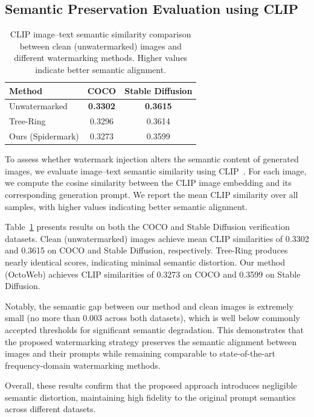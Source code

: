 \documentclass[lettersize,journal,review]{IEEEtran}
\begin{document}
\subsection{Semantic Preservation Evaluation using CLIP}

\begin{table}[t]
\centering
\caption{CLIP image--text semantic similarity comparison between clean (unwatermarked) images and different watermarking methods. Higher values indicate better semantic alignment.}
\label{tab:clip_similarity}
\begin{tabular}{lcc}
\toprule
\textbf{Method} & \textbf{COCO} & \textbf{Stable Diffusion} \\
\midrule
Unwatermarked & \textbf{0.3302} & \textbf{0.3615} \\
Tree-Ring             & 0.3296          & 0.3614          \\
Ours (Spidermark)        & 0.3273          & 0.3599          \\
\bottomrule
\end{tabular}
\end{table}


To assess whether watermark injection alters the semantic content of generated images, we evaluate image--text semantic similarity using CLIP~\cite{radford2021clip}. For each image, we compute the cosine similarity between the CLIP image embedding and its corresponding generation prompt. We report the mean CLIP similarity over all samples, with higher values indicating better semantic alignment.

Table~\ref{tab:clip_similarity} presents results on both the COCO and Stable Diffusion verification datasets. Clean (unwatermarked) images achieve mean CLIP similarities of 0.3302 and 0.3615 on COCO and Stable Diffusion, respectively. Tree-Ring produces nearly identical scores, indicating minimal semantic distortion. Our method (OctoWeb) achieves CLIP similarities of 0.3273 on COCO and 0.3599 on Stable Diffusion.

Notably, the semantic gap between our method and clean images is extremely small (no more than 0.003 across both datasets), which is well below commonly accepted thresholds for significant semantic degradation. This demonstrates that the proposed watermarking strategy preserves the semantic alignment between images and their prompts while remaining comparable to state-of-the-art frequency-domain watermarking methods.

Overall, these results confirm that the proposed approach introduces negligible semantic distortion, maintaining high fidelity to the original prompt semantics across different datasets.
\end{document}
